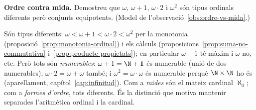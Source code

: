 \begin{exercici}
\textbf{Ordre contra mida.} Demostreu que \(\omega\), \(\omega+1\), \(\omega\cdot2\) i \(\omega^2\) són tipus ordinals diferents però conjunts equipotents. (Model de l'observació~\ref{obs:ordre-vs-mida}.)
\end{exercici}
\begin{solucio}
Són tipus diferents: \(\omega<\omega+1<\omega\cdot2<\omega^2\) per la monotonia (proposició~\ref{prop:monotonia-ordinal}) i els càlculs (proposicions~\ref{prop:suma-no-commutativa} i~\ref{prop:producte-propietats}); en particular \(\omega+1\) té màxim i \(\omega\) no, etc. Però tots són \emph{numerables}: \(\omega+1=\N+\mathbf1\) és numerable (unió de dos numerables); \(\omega\cdot2=\omega+\omega\) també; i \(\omega^2=\omega\cdot\omega\) és numerable perquè \(\N\times\N\) ho és (aparellament, capítol~\ref{cap:infinitud}). Com a \emph{mides} són el mateix cardinal \(\aleph_0\); com a \emph{formes d'ordre}, tots diferents. És la distinció que motiva mantenir separades l'aritmètica ordinal i la cardinal.
\end{solucio}
